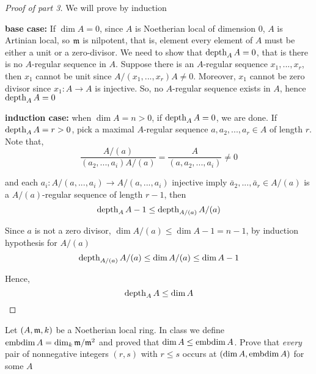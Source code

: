 \begin{proof}[Proof of part 3]
	We will prove by induction
	
	\textbf{base case:} If $\dim A = 0$, since $A$ is Noetherian local of dimension $0$, $A$ is Artinian local, so $\mathfrak{m}$ is nilpotent, that is, element every element of $A$ must be either a unit or a zero-divisor. We need to show that $\operatorname{depth}_A A = 0$, that is there is no $A$-regular sequence in $A$. Suppose there is an  $A$-regular sequence $x_1, ..., x_r$, then $x_1$ cannot be unit since $A / (x_1, ..., x_r) A \neq 0$. Moreover, $x_1$ cannot be zero divisor since $x_1: A \to A$ is injective. So, no $A$-regular sequence exists in $A$, hence $\operatorname{depth}_A A = 0$
	
	\textbf{induction case:} when $\dim A = n > 0$, if $\operatorname{depth}_A A = 0$, we are done. If $\operatorname{depth}_A A = r > 0$, pick a maximal $A$-regular sequence $a, a_2, ..., a_r \in A$ of length $r$. Note that, 
	$$
		\frac{A / (a)}{(a_2, ..., a_i) A / (a)} = \frac{A}{(a, a_2, ..., a_i)} \neq 0
	$$
	
	and each $a_i: A / (a, ..., a_i) \to A / (a, ..., a_i)$ injective imply $\bar{a}_2, ..., \bar{a}_r \in A / (a)$ is a $A / (a)$-regular sequence of length $r-1$, then
	$$
		\operatorname{depth}_A A - 1 \leq \operatorname{depth}_{A / (a)} A / (a)
	$$
	
	Since $a$ is not a zero divisor, $\dim A / (a) \leq \dim A - 1 = n-1$, by induction hypothesis for $A / (a)$
	$$
		\operatorname{depth}_{A / (a)} A / (a) \leq \dim A / (a) \leq \dim A - 1 
	$$
	
	Hence, 
	$$
		\operatorname{depth}_A A \leq \dim A
	$$
\end{proof}

\begin{problem}
	Let $(A, \mathfrak{m}, k)$ be a Noetherian local ring. In class we define $\operatorname{embdim} A = \dim_k \mathfrak{m} / \mathfrak{m}^2$ and proved that $\dim A \leq \operatorname{embdim} A$. Prove that \textit{every} pair of nonnegative integers $(r, s)$ with $r \leq s$ occurs at $(\dim A, \operatorname{embdim} A)$ for some $A$
\end{problem}

